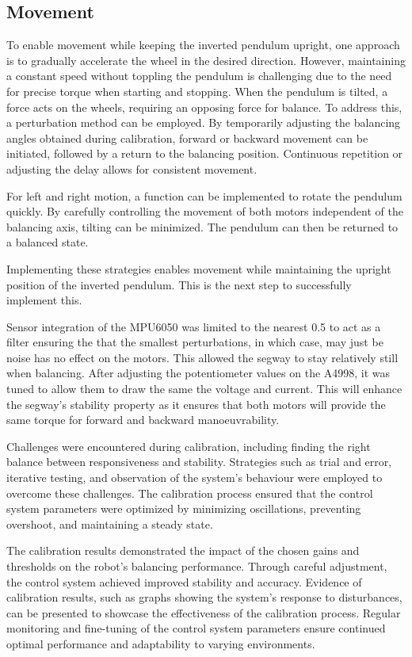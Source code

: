 \subsection{Movement}

To enable movement while keeping the inverted pendulum upright, one approach is to gradually accelerate the wheel in the desired direction. However, maintaining a constant speed without toppling the pendulum is challenging due to the need for precise torque when starting and stopping. 
When the pendulum is tilted, a force acts on the wheels, requiring an opposing force for balance. To address this, a perturbation method can be employed. By temporarily adjusting the balancing angles obtained during calibration, forward or backward movement can be initiated, followed by a return to the balancing position. Continuous repetition or adjusting the delay allows for consistent movement.


For left and right motion, a function can be implemented to rotate the pendulum quickly. By carefully controlling the movement of both motors independent of the balancing axis, tilting can be minimized. The pendulum can then be returned to a balanced state.

Implementing these strategies enables movement while maintaining the upright position of the inverted pendulum. This is the next step to successfully implement this. 

Sensor integration of the MPU6050 was limited to the nearest 0.5 to act as a filter ensuring the that the smallest perturbations, in which case, may just be noise has no effect on the motors. This allowed the segway to stay relatively still when balancing. After adjusting the potentiometer values on the A4998, it was tuned to allow them to draw the same the voltage and current. This will enhance the segway’s stability property as it ensures that both motors will provide the same torque for forward and backward manoeuvrability. 

Challenges were encountered during calibration, including finding the right balance between responsiveness and stability. Strategies such as trial and error, iterative testing, and observation of the system's behaviour were employed to overcome these challenges. The calibration process ensured that the control system parameters were optimized by minimizing oscillations, preventing overshoot, and maintaining a steady state.

The calibration results demonstrated the impact of the chosen gains and thresholds on the robot's balancing performance. Through careful adjustment, the control system achieved improved stability and accuracy. Evidence of calibration results, such as graphs showing the system's response to disturbances, can be presented to showcase the effectiveness of the calibration process. Regular monitoring and fine-tuning of the control system parameters ensure continued optimal performance and adaptability to varying environments.

